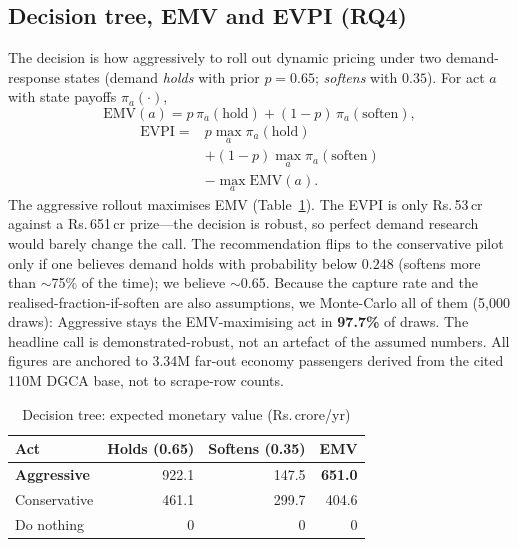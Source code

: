 \documentclass[conference]{IEEEtran}
\newcommand{\INR}{\mbox{Rs.}}
\newcommand{\cr}{\,cr}        %
\begin{document}
\subsection{Decision tree, EMV and EVPI (RQ4)}
The decision is how aggressively to roll out dynamic pricing under two demand-response states (demand \emph{holds} with prior $p=0.65$; \emph{softens} with $0.35$). For act $a$ with state payoffs $\pi_a(\cdot)$,
\begin{equation}
\mathrm{EMV}(a) = p\,\pi_a(\text{hold}) + (1-p)\,\pi_a(\text{soften}),
\label{eq:emv}
\end{equation}
\begin{equation}
\begin{aligned}
\mathrm{EVPI} ={}& p\max_a \pi_a(\text{hold}) \\
&+ (1-p)\max_a \pi_a(\text{soften}) \\
&- \max_a \mathrm{EMV}(a).
\end{aligned}
\label{eq:evpi}
\end{equation}
The aggressive rollout maximises EMV (Table~\ref{tab:dt}). The EVPI is only \INR{}\,53\cr{} against a \INR{}\,651\cr{} prize---the decision is robust, so perfect demand research would barely change the call. The recommendation flips to the conservative pilot only if one believes demand holds with probability below $0.248$ (softens more than $\sim$75\% of the time); we believe $\sim$0.65. Because the capture rate and the realised-fraction-if-soften are also assumptions, we Monte-Carlo all of them (5{,}000 draws): Aggressive stays the EMV-maximising act in \textbf{97.7\%} of draws. The headline call is demonstrated-robust, not an artefact of the assumed numbers. All figures are anchored to 3.34M far-out economy passengers derived from the cited 110M DGCA base, not to scrape-row counts.

\begin{table}[!t]
\caption{Decision tree: expected monetary value (\INR{}\,crore/yr)}
\label{tab:dt}
\centering
\renewcommand{\arraystretch}{1.1}
\begin{tabular}{@{}lrrr@{}}
\toprule
\textbf{Act} & \textbf{Holds (0.65)} & \textbf{Softens (0.35)} & \textbf{EMV}\\
\midrule
\textbf{Aggressive} & 922.1 & 147.5 & \textbf{651.0}\\
Conservative & 461.1 & 299.7 & 404.6\\
Do nothing & 0 & 0 & 0\\
\bottomrule
\end{tabular}
\end{table}
\end{document}
